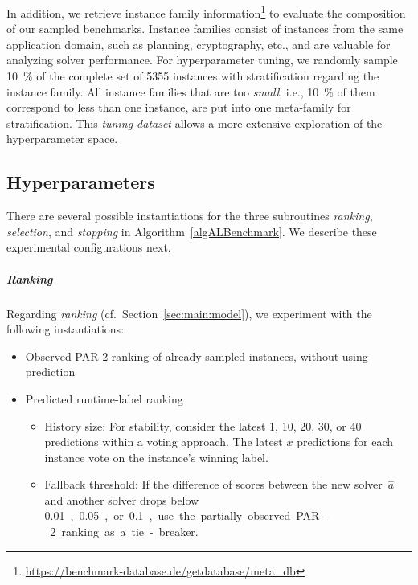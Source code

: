 \documentclass[sn-basic, Numbered]{sn-jnl} %
\begin{document}
In addition, we retrieve instance family information\footnote{\url{https://benchmark-database.de/getdatabase/meta_db}} to evaluate the composition of our sampled benchmarks.
Instance families consist of instances from the same application domain, such as planning, cryptography, etc., and are valuable for analyzing solver performance.
%
For hyperparameter tuning, we randomly sample \SI{10}{\%} of the complete set of 5355 instances with stratification regarding the instance family.
All instance families that are too \emph{small}, i.e., \SI{10}{\%} of them correspond to less than one instance, are put into one meta-family for stratification.
This \emph{tuning dataset} allows a more extensive exploration of the hyperparameter space.

\subsection{Hyperparameters}
\label{sec:exdesign:hyper}

There are several possible instantiations for the three subroutines \emph{ranking}, \emph{selection}, and \emph{stopping} in Algorithm~\ref{algALBenchmark}.
We describe these experimental configurations next.

\subparagraph{Ranking}

Regarding \emph{ranking} (cf.~Section~\ref{sec:main:model}), we experiment with the following instantiations:

\begin{itemize}\setlength{\itemsep}{1pt}
  \item Observed PAR-2 ranking of already sampled instances, without using prediction
  \item Predicted runtime-label ranking
  \vspace*{-1ex}
  \begin{itemize}\setlength{\itemsep}{1pt}
    \item
    History size: For stability, consider the latest 1, 10, 20, 30, or 40 predictions within a voting approach.
    The latest $x$ predictions for each instance vote on the instance's winning label.
    \item
    Fallback threshold: If the difference of scores between the new solver~$\hat{a}$ and another solver drops below \SI{0.01}, \SI{0.05}, or \SI{0.1}, use the partially observed PAR-2 ranking as a tie-breaker.
  \end{itemize}
\end{itemize}
\end{document}
